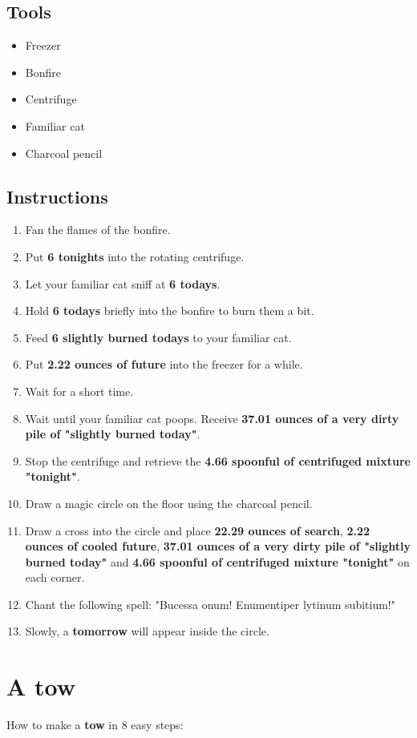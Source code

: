 \documentclass{article}
\begin{document}
\subsection{Tools}\begin{itemize}
\item 
Freezer
\item 
Bonfire
\item 
Centrifuge
\item 
Familiar cat
\item 
Charcoal pencil
\end{itemize}
\subsection{Instructions}\begin{enumerate}
\item 
Fan the flames of the bonfire.
\item 
Put \textbf{6 tonights} into the rotating centrifuge.
\item 
Let your familiar cat sniff at \textbf{6 todays}.
\item 
Hold \textbf{6 todays} briefly into the bonfire to burn them a bit.
\item 
Feed \textbf{6 slightly burned todays} to your familiar cat.
\item 
Put \textbf{2.22 ounces of future} into the freezer for a while.
\item 
Wait for a short time.
\item 
Wait until your familiar cat poops. Receive \textbf{37.01 ounces of a very dirty pile of "slightly burned today"}.
\item 
Stop the centrifuge and retrieve the \textbf{4.66 spoonful of centrifuged mixture "tonight"}.
\item 
Draw a magic circle on the floor using the charcoal pencil.
\item 
Draw a cross into the circle and place \textbf{22.29 ounces of search}, \textbf{2.22 ounces of cooled future}, \textbf{37.01 ounces of a very dirty pile of "slightly burned today"} and \textbf{4.66 spoonful of centrifuged mixture "tonight"} on each corner.
\item 
Chant the following spell: "Bucessa onum! Enumentiper lytinum subitium!"
\item 
Slowly, a \textbf{tomorrow} will appear inside the circle.
\end{enumerate}
\newpage
\section{A tow}How to make a \textbf{tow} in 8 easy steps:
\end{document}
